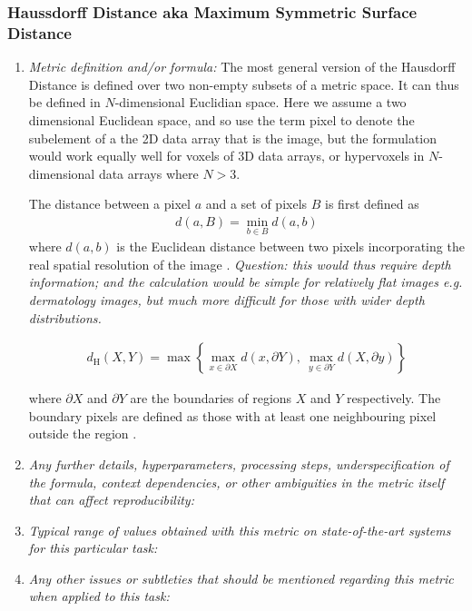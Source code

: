 \documentclass[a4paper,11pt]{article}
\begin{document}
        \subsubsection{Haussdorff Distance aka Maximum Symmetric Surface Distance}
            \begin{enumerate}[label=\alph*.]
                \item \textit{Metric definition and/or formula:}
                    The most general version of the Hausdorff Distance is defined over two non-empty subsets of a metric space. It can thus be defined in $N$-dimensional Euclidian space. Here we assume a two dimensional Euclidean space, and so use the term pixel to denote the subelement of a the 2D data array that is the image, but the formulation would work equally well for voxels of 3D data arrays, or hypervoxels in $N$-dimensional data arrays where $N > 3$.  

                    The distance between a pixel $a$ and a set of pixels $B$ is first defined as
                    \begin{align}
                        d(a, B) = \min_{b \in B} d(a, b) \label{distance_element_a_to_set_B_minimum}
                    \end{align}
                    where $d(a, b)$ is the Euclidean distance between two pixels incorporating the real spatial resolution of the image \cite{yeghiazaryan2018family}. \textit{Question: this would thus require depth information; and the calculation would be simple for relatively flat images e.g. dermatology images, but much more difficult for those with wider depth distributions.}

                    \begin{align}
                        d_{\textrm{H}}\left(X, Y\right) = \max
                            \left\{
                                \max_{x \in \partial X} d\left(x, \partial Y\right),\
                                \max_{y \in \partial Y} d\left(X, \partial y\right)
                            \right\}
                    \end{align}

                    where $\partial X$ and $\partial Y$ are the boundaries of regions $X$ and $Y$ respectively. The boundary pixels are defined as those with at least one neighbouring pixel outside the region \cite{yeghiazaryan2018family}.

                \bigskip
                \item \textit{Any further details, hyperparameters, processing steps, underspecification of the formula, context dependencies, or other ambiguities in the metric itself that can affect reproducibility:}
                \bigskip
                \item \textit{Typical range of values obtained with this metric on state-of-the-art systems for this particular task:}
                \bigskip
                \item \textit{Any other issues or subtleties that should be mentioned regarding this metric when applied to this task:}
                \bigskip
            \end{enumerate}
\end{document}
